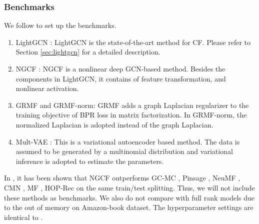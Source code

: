 \documentclass[sigconf]{acmart}
\begin{document}
\begin{table}[t]
\caption{Statistics of the experimented data.}
\label{tab:dataset}
\end{table}

\subsubsection{Benchmarks}
We follow \cite{he2020lightgcn} to set up the benchmarks.  
\begin{enumerate}
    \item LightGCN \cite{he2020lightgcn}: LightGCN is the state-of-the-art method for CF. Please refer to Section \ref{sec:lightgcn} for a detailed description. 
    \item NGCF \cite{wang2019neural}: NGCF is a nonlinear deep GCN-based method. Besides the components in LightGCN, it contains of feature transformation, and nonlinear activation. 
    \item GRMF and GRMF-norm\cite{rao2015collaborative,he2020lightgcn}: GRMF adds a graph Laplacian regularizer to the training objective of BPR loss in matrix factorization. In GRMF-norm, the normalized Laplacian is adopted instead of the graph Laplacian.
    \item Mult-VAE \cite{liang2018variational}: This is a variational autoencoder based method. The data is assumed to be generated by a multinomial distribution and variational inference is adopted to estimate the parameters. 
\end{enumerate}
In \cite{wang2019neural}, it has been shown that NGCF outperforms GC-MC \cite{berg2017graph}, Pinsage \cite{ying2018graph}, NeuMF \cite{he2017neural}, CMN \cite{ebesu2018collaborative}, MF \cite{rendle2012bpr}, HOP-Rec \cite{yang2018hop} on the same train/test splitting. Thus, we will not include these methods as benchmarks. We also do not compare with full rank models \cite{ning2011slim,steck2019markov} due to the out of memory on Amazon-book dataset. The hyperparameter settings are identical to \cite{he2020lightgcn}.
\end{document}
